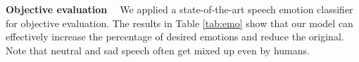 \documentclass{article}
\begin{document}


\noindent \textbf{Objective evaluation \ } We applied a state-of-the-art speech emotion classifier \cite{mirsamadi2017automatic} for objective evaluation. The results in Table \ref{tab:emo} show that our model can effectively increase the percentage of desired emotions and reduce the original. Note that neutral and sad speech often get mixed up even by humans.


\end{document}
